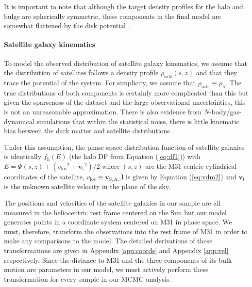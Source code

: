\documentclass[preprint,12pt]{aastex}
\newcommand{\eq}[1]{Equation (\ref{eq:#1})}
\newcommand{\app}[1]{Appendix \ref{app:#1}}
\newcommand{\bvec}[1]{\ensuremath{\boldsymbol{#1}}}
\renewcommand{\vector}[1]{\ensuremath{\bvec{#1}}}
\newcommand{\df}{f}
\newcommand{\dfs}[1]{\df_\mathrm{#1}}
\newcommand{\dfhalo}{\dfs{\halo}}
\newcommand{\E}{\ensuremath{E}}
\newcommand{\halo}{\mathrm{h}}
\newcommand{\vlos}{\ensuremath{v_\mathrm{los}}}
\newcommand{\vt}{\ensuremath{\vector{v}_\mathrm{t}}}
\newcommand{\vrel}[2]{\ensuremath{\vector{v}_{\mathrm{#1},\mathrm{#2}}}}
\newcommand{\los}{\ensuremath{\hat{\vector{l}}}}
\begin{document}
It is important to note that although the target density profiles for the halo
and bulge are spherically symmetric, these components in the final model are
somewhat flattened by the disk potential
\citep[see the discussion in][]{Widrow:2008}.

\paragraph{Satellite galaxy kinematics}

To model the observed distribution of satellite galaxy kinematics, we assume
that the distribution of satellites follows a density profile
$\rho_\mathrm{sats} (s,z)$ and that they trace the potential of the system.
For simplicity, we assume that $\rho_\mathrm{sats} \equiv \rho_\halo$. The
true distributions of both components is certainly more complicated than this
but given the sparseness of the dataset and the large observational
uncertainties, this is not an unreasonable approximation. There is also
evidence from $N$-body/gas-dynamical simulations that within the
statistical noise, there is little kinematic bias between the dark matter
and satellite distributions \citep{Sales:2007b}.

Under this assumption, the phase space distribution function of satellite
galaxies is identically $\dfhalo (\E)$ (the halo DF from \eq{df1}) with
$\E = \Psi (s,z) + \left ( \vlos^2 + \vt^2 \right )/2$ where
$(s,z)$ are the M31-centric cylindrical coordinates of the satellite,
$\vlos \equiv \vrel{S,A}\cdot\los$ is given by \eq{vdm2}
and $\vt$ is the unknown satellite velocity in the plane of the sky.

The positions and velocities of the satellite galaxies in our sample are all
measured in the heliocentric rest frame centered on the Sun but our model
generates points in a coordinate system centered on M31 in phase space. We
must, therefore, transform the observations into the rest frame of M31 in
order to make any comparisons to the model. The detailed derivations of these
transformations are given in \app{coords} and \app{vel} respectively. Since
the distance to M31 and the three components of its bulk motion are
parameters in our model, we must actively perform these transformation for
every sample in our MCMC analysis.
\end{document}
